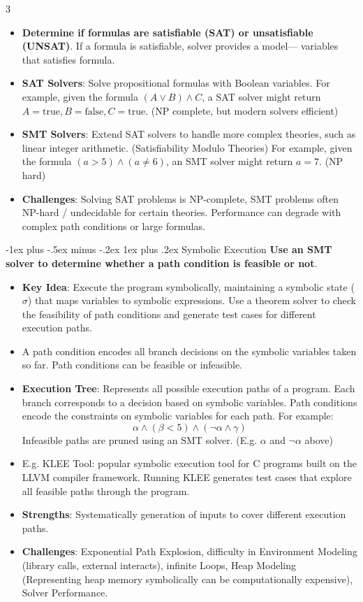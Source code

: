 \documentclass[a4paper, 10pt, landscape]{article}
\makeatletter
\renewcommand{\subsubsection}{\@startsection{subsubsection}{3}{0mm}%
                                {-1ex plus -.5ex minus -.2ex}%
                                {1ex plus .2ex}%
                                {\normalfont\small\bfseries}}
\makeatother
\begin{document}
\begin{multicols*}{3}
\begin{itemize}
\item \textbf{Determine if formulas are satisfiable (SAT) or unsatisfiable (UNSAT)}. If a formula is satisfiable, solver provides a model— variables that satisfies formula. 
\item \textbf{SAT Solvers}: Solve propositional formulas with Boolean variables. For example, given the formula $(A \lor B) \land C$, a SAT solver might return $A = \text{true}, B = \text{false}, C = \text{true}$. (NP complete, but modern solvers efficient)
\item \textbf{SMT Solvers}: Extend SAT solvers to handle more complex theories, such as linear integer arithmetic. (Satisfiability Modulo Theories) For example, given the formula $(a > 5) \land (a \neq 6)$, an SMT solver might return $a = 7$. (NP hard)
\item \textbf{Challenges}: Solving SAT problems is NP-complete, SMT problems often NP-hard / undecidable for certain theories. Performance can degrade with complex path conditions or large formulas.
\end{itemize}

\subsubsection{Symbolic Execution}
\textbf{Use an SMT solver to determine whether a path condition is feasible or not}.
\begin{itemize}
\item \textbf{Key Idea}: Execute the program symbolically, maintaining a symbolic state ($\sigma$) that maps variables to symbolic expressions. Use a theorem solver to check the feasibility of path conditions and generate test cases for different execution paths.
\item A path condition encodes all branch decisions on the symbolic variables taken so far. Path conditions can be 
feasible or infeasible.
\item \textbf{Execution Tree}: Represents all possible execution paths of a program. Each branch corresponds to a decision based on symbolic variables. Path conditions encode the constraints on symbolic variables for each path. For example:
        \[
        \alpha \land (\beta < 5) \land (\neg\alpha \land \gamma)
        \]
Infeasible paths are pruned using an SMT solver. (E.g. $\alpha$ and $\neg\alpha$ above)
\item E.g. KLEE Tool: popular symbolic execution tool for C programs built on the LLVM compiler framework. Running KLEE generates test cases that explore all feasible paths through the program.
\item \textbf{Strengths}: Systematically generation of inputs to cover different execution paths.
 \item \textbf{Challenges}: Exponential Path Explosion, difficulty in Environment Modeling (library calls, external interacts), infinite Loops, Heap Modeling (Representing heap memory symbolically can be computationally expensive), Solver Performance.
\end{itemize}



\end{multicols*}
\end{document}
